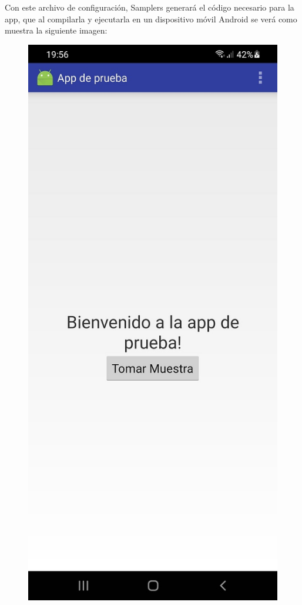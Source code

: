 Con este archivo de configuración, Samplers generará el código necesario para la app, que al compilarla y ejecutarla en un dispositivo móvil Android se verá como muestra la siguiente imagen:



\begin{figure}[H]
	\begin{center}
   \includegraphics[scale=0.3]{05-implementacion/app_generada_ejemplo1.jpg} 

\end{center}
\end{figure}
